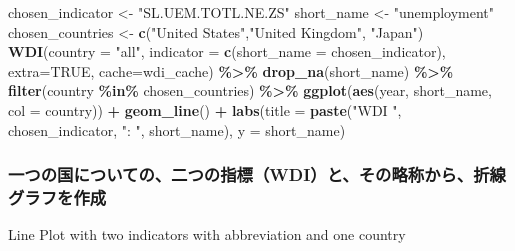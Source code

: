 \documentclass[
  xelatex, ja=standard]{bxjsbook}
\newenvironment{Shaded}{\begin{snugshade}}{\end{snugshade}}
\newcommand{\AttributeTok}[1]{\textcolor[rgb]{0.13,0.29,0.53}{#1}}
\newcommand{\ConstantTok}[1]{\textcolor[rgb]{0.56,0.35,0.01}{#1}}
\newcommand{\FunctionTok}[1]{\textcolor[rgb]{0.13,0.29,0.53}{\textbf{#1}}}
\newcommand{\NormalTok}[1]{#1}
\newcommand{\OtherTok}[1]{\textcolor[rgb]{0.56,0.35,0.01}{#1}}
\newcommand{\SpecialCharTok}[1]{\textcolor[rgb]{0.81,0.36,0.00}{\textbf{#1}}}
\newcommand{\StringTok}[1]{\textcolor[rgb]{0.31,0.60,0.02}{#1}}
\theoremstyle{definition}
\theoremstyle{definition}
\theoremstyle{definition}
\theoremstyle{definition}
\theoremstyle{remark}
\begin{document}
\begin{Shaded}
\begin{Highlighting}[]
\NormalTok{chosen\_indicator }\OtherTok{\textless{}{-}} \StringTok{"SL.UEM.TOTL.NE.ZS"}
\NormalTok{short\_name }\OtherTok{\textless{}{-}} \StringTok{"unemployment"}
\NormalTok{chosen\_countries }\OtherTok{\textless{}{-}} \FunctionTok{c}\NormalTok{(}\StringTok{"United States"}\NormalTok{,}\StringTok{"United Kingdom"}\NormalTok{, }\StringTok{"Japan"}\NormalTok{)}
\FunctionTok{WDI}\NormalTok{(}\AttributeTok{country =} \StringTok{"all"}\NormalTok{, }\AttributeTok{indicator =} \FunctionTok{c}\NormalTok{(}\AttributeTok{short\_name =}\NormalTok{ chosen\_indicator), }\AttributeTok{extra=}\ConstantTok{TRUE}\NormalTok{, }\AttributeTok{cache=}\NormalTok{wdi\_cache) }\SpecialCharTok{\%\textgreater{}\%} \FunctionTok{drop\_na}\NormalTok{(short\_name) }\SpecialCharTok{\%\textgreater{}\%} 
  \FunctionTok{filter}\NormalTok{(country }\SpecialCharTok{\%in\%}\NormalTok{ chosen\_countries) }\SpecialCharTok{\%\textgreater{}\%} 
  \FunctionTok{ggplot}\NormalTok{(}\FunctionTok{aes}\NormalTok{(year, short\_name, }\AttributeTok{col =}\NormalTok{ country)) }\SpecialCharTok{+} \FunctionTok{geom\_line}\NormalTok{() }\SpecialCharTok{+}
  \FunctionTok{labs}\NormalTok{(}\AttributeTok{title =} \FunctionTok{paste}\NormalTok{(}\StringTok{"WDI "}\NormalTok{, chosen\_indicator, }\StringTok{": "}\NormalTok{, short\_name), }\AttributeTok{y =}\NormalTok{ short\_name)}
\end{Highlighting}
\end{Shaded}

\hypertarget{ux4e00ux3064ux306eux56fdux306bux3064ux3044ux3066ux306eux4e8cux3064ux306eux6307ux6a19wdiux3068ux305dux306eux7565ux79f0ux304bux3089ux6298ux7ddaux30b0ux30e9ux30d5ux3092ux4f5cux6210}{%
\subsubsection{一つの国についての、二つの指標（WDI）と、その略称から、折線グラフを作成}\label{ux4e00ux3064ux306eux56fdux306bux3064ux3044ux3066ux306eux4e8cux3064ux306eux6307ux6a19wdiux3068ux305dux306eux7565ux79f0ux304bux3089ux6298ux7ddaux30b0ux30e9ux30d5ux3092ux4f5cux6210}}

Line Plot with two indicators with abbreviation and one country
\end{document}
